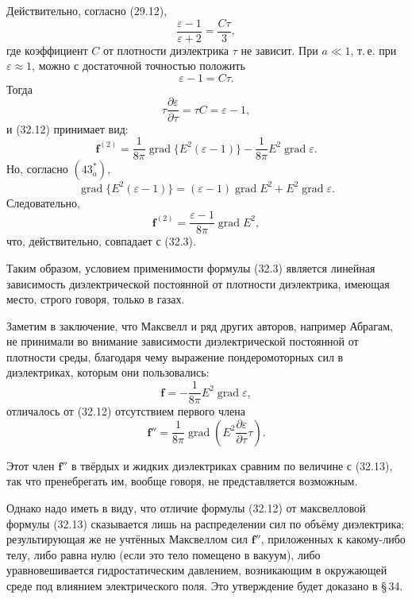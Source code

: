 \documentclass[a4paper,10pt]{article}
\begin{document}
Действительно, согласно (29.12),
$$
    \frac{\varepsilon-1}{\varepsilon+2} = \frac{C\tau}{3},
$$
где коэффициент $C$ от плотности диэлектрика $\tau$ не зависит. При
$a \ll 1$, т.\,е. при $\varepsilon \approx 1$, можно с достаточной
точностью положить
$$
    \varepsilon - 1 = C\tau.
$$
Тогда
$$
    \tau\frac{\partial\varepsilon}{\partial\tau} = \tau C = \varepsilon - 1,
$$
и (32.12) принимает вид:
$$
    \mathbf{f}^{(2)} = \frac{1}{8\pi}\operatorname{grad}\{E^2(\varepsilon-1)\}
                     - \frac{1}{8\pi}E^2\operatorname{grad}\varepsilon.
$$
Но, согласно $(43^*_a)$,
$$
    \operatorname{grad}\{E^2(\varepsilon-1)\}
    = (\varepsilon-1)\operatorname{grad}E^2 + E^2\operatorname{grad}\varepsilon.
$$
Следовательно,
$$
    \mathbf{f}^{(2)} = \frac{\varepsilon-1}{8\pi}\operatorname{grad}E^2,
$$
что, действительно, совпадает с (32.3).

Таким образом, условием применимости формулы (32.3) является линейная
зависимость диэлектрической постоянной от плотности диэлектрика,
имеющая место, строго говоря, только в газах.

Заметим в заключение, что Максвелл и ряд других авторов, например
Абрагам, не принимали во внимание зависимости диэлектрической постоянной
от плотности среды, благодаря чему выражение пондеромоторных сил
в диэлектриках, которым они пользовались:
\begin{equation}
    \mathbf{f} = -\frac{1}{8\pi}E^2\operatorname{grad}\varepsilon,
    \tag{32.13}
\end{equation}
отличалось от (32.12) отсутствием первого члена
\begin{equation}
    \mathbf{f}'' = \frac{1}{8\pi}\operatorname{grad}\!\left(
        E^2\frac{\partial\varepsilon}{\partial\tau}\tau
    \right).
    \tag{32.14}
\end{equation}


Этот член $\mathbf{f}''$ в твёрдых и жидких диэлектриках сравним по
величине с (32.13), так что пренебрегать им, вообще говоря, не
представляется возможным.

Однако надо иметь в виду, что отличие формулы (32.12) от максвелловой
формулы (32.13) сказывается лишь на распределении сил по объёму
диэлектрика; результирующая же не учтённых Максвеллом сил $\mathbf{f}''$,
приложенных к какому-либо телу, либо равна нулю (если это тело помещено
в вакуум), либо уравновешивается гидростатическим давлением, возникающим
в окружающей среде под влиянием электрического поля. Это утверждение
будет доказано в §\,34.
\end{document}

